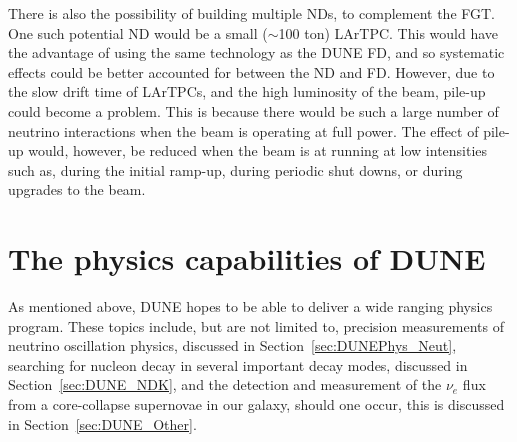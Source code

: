 There is also the possibility of building multiple NDs, to complement the FGT. One such potential ND would be a small ($\sim$100 ton) LArTPC. This would have the advantage of using the same technology as the DUNE FD, and so systematic effects could be better accounted for between the ND and FD. However, due to the slow drift time of LArTPCs, and the high luminosity of the beam, pile-up could become a problem. This is because there would be such a large number of neutrino interactions when the beam is operating at full power. The effect of pile-up would, however, be reduced when the beam is at running at low intensities such as, during the initial ramp-up, during periodic shut downs, or during upgrades to the beam. \\

\section{The physics capabilities of DUNE} \label{sec:DUNEPhys}%
As mentioned above, DUNE hopes to be able to deliver a wide ranging physics program. These topics include, but are not limited to, precision measurements of neutrino oscillation physics, discussed in Section~\ref{sec:DUNEPhys_Neut}, searching for nucleon decay in several important decay modes, discussed in Section~\ref{sec:DUNE_NDK}, and the detection and measurement of the $\nu_e$ flux from a core-collapse supernovae in our galaxy, should one occur, this is discussed in Section~\ref{sec:DUNE_Other}. \\

